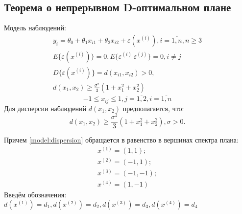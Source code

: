 \subsection{Теорема о непрерывном D-оптимальном плане}
Модель наблюдений:
\begin{gather} \label{model:start}
y_i = \theta_0 + \theta_1 x_{i1} + \theta_2 x_{i2} + \varepsilon(x^{(i)}), i = \overline{1, n}, n \ge 3 \\
E\{ \varepsilon(x^{(i)}) \} = 0, E\{ \varepsilon^{(i)}\ \varepsilon^{(j)} \} = 0, i \ne j \\
D\{ \varepsilon(x^{(i)}) \} = d(x_{i1}, x_{i2}) > 0, \\
d(x_1, x_2) \ge \frac{\sigma^2}{3}(1 + x_1^2 + x_2^2) \label{model:end}
\end{gather}
$$ -1 \le x_{ij} \le 1, j = \overline{1, 2}, i = \overline{1, n}$$
Для дисперсии наблюдений $d(x_1, x_2)$ предполагается, что:
\begin{equation}\label{model:dispersion}
d(x_1, x_2) \ge \frac{\sigma^2}{3}(1 + x_1^2 + x_2^2), \sigma > 0.
\end{equation}

Причем \eqref{model:dispersion} обращается в равенство в вершинах спектра плана:
\begin{equation}\label{plan-points}
\begin{gathered}
x^{(1)}=(1, 1); \\
x^{(2)}=(-1, 1); \\
x^{(3)}=(-1, -1); \\
x^{(4)}=(1, -1)
\end{gathered}
\end{equation}
Введём обозначения: $d(x^{(1)}) = d_1, d(x^{(2)}) = d_2, d(x^{(3)}) = d_3, d(x^{(4)}) = d_4$

